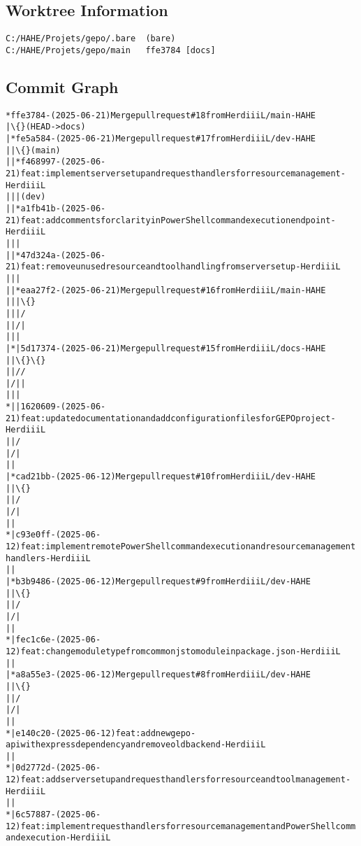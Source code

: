 \subsection*{Worktree Information}
\scriptsize
\begin{verbatim}
C:/HAHE/Projets/gepo/.bare  (bare)
C:/HAHE/Projets/gepo/main   ffe3784 [docs]
\end{verbatim}
\footnotesize

\pagebreak

\subsection*{Commit Graph}
\begin{alltt}
*   ffe3784 - (2025-06-21) Merge pull request \#18 from HerdiiiL/main - HAHE
|\textbackslash\{\}   (HEAD -> docs)
| *   fe5a584 - (2025-06-21) Merge pull request \#17 from HerdiiiL/dev - HAHE
| |\textbackslash\{\}   (main)
| | * f468997 - (2025-06-21) feat: implement server setup and request handlers for resource management - HerdiiiL
| | |  (dev)
| | * a1fb41b - (2025-06-21) feat: add comments for clarity in PowerShell command execution endpoint - HerdiiiL
| | | 
| | * 47d324a - (2025-06-21) feat: remove unused resource and tool handling from server setup - HerdiiiL
| | |   
| | *   eaa27f2 - (2025-06-21) Merge pull request \#16 from HerdiiiL/main - HAHE
| | |\textbackslash\{\}  
| | |/  
| |/|   
| | |   
| * |   5d17374 - (2025-06-21) Merge pull request \#15 from HerdiiiL/docs - HAHE
| |\textbackslash\{\} \textbackslash\{\}  
| |/ /  
|/| |   
| | | 
* | | 1620609 - (2025-06-21) feat: update documentation and add configuration files for GEPO project - HerdiiiL
| |/  
|/|   
| |   
| *   cad21bb - (2025-06-12) Merge pull request \#10 from HerdiiiL/dev - HAHE
| |\textbackslash\{\}  
| |/  
|/|   
| | 
* | c93e0ff - (2025-06-12) feat: implement remote PowerShell command execution and resource management handlers - HerdiiiL
| |   
| *   b3b9486 - (2025-06-12) Merge pull request \#9 from HerdiiiL/dev - HAHE
| |\textbackslash\{\}  
| |/  
|/|   
| | 
* | fec1c6e - (2025-06-12) feat: change module type from commonjs to module in package.json - HerdiiiL
| |   
| *   a8a55e3 - (2025-06-12) Merge pull request \#8 from HerdiiiL/dev - HAHE
| |\textbackslash\{\}  
| |/  
|/|   
| | 
* | e140c20 - (2025-06-12) feat: add new gepo-api with express dependency and remove old backend - HerdiiiL
| | 
* | 0d2772d - (2025-06-12) feat: add server setup and request handlers for resource and tool management - HerdiiiL
| | 
* | 6c57887 - (2025-06-12) feat: implement request handlers for resource management and PowerShell command execution - HerdiiiL

\end{alltt}
